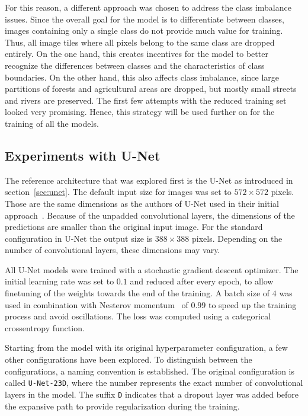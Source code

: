 For this reason, a different approach was chosen to address the class imbalance issues. Since the overall goal for the model is to differentiate between classes, images containing only a single class do not provide much value for training. Thus, all image tiles where all pixels belong to the same class are dropped entirely. On the one hand, this creates incentives for the model to better recognize the differences between classes and the characteristics of class boundaries. On the other hand, this also affects class imbalance, since large partitions of forests and agricultural areas are dropped, but mostly small streets and rivers are preserved. The first few attempts with the reduced training set looked    very promising. Hence, this strategy will be used further on for the training of all the models.


\subsection{Experiments with U-Net}
\label{sec:unet_experiments}
The reference architecture that was explored first is the U-Net as introduced in section~\ref{sec:unet}. The default input size for images was set to $572\times 572$ pixels. Those are the same dimensions as the authors of U-Net used in their initial approach~\cite{unet15}. Because of the unpadded convolutional layers, the dimensions of the predictions are smaller than the original input image. For the standard configuration in U-Net the output size is $388\times 388$ pixels. Depending on the number of convolutional layers, these dimensions may vary.

All U-Net models were trained with a stochastic gradient descent optimizer. The initial learning rate was set to $0.1$ and reduced after every epoch, to allow finetuning of the weights towards the end of the training. A batch size of $4$ was used in combination with Nesterov momentum~\cite{nesterov83} of $0.99$ to speed up the training process and avoid oscillations. The loss was computed using a categorical crossentropy function.

Starting from the model with its original hyperparameter configuration, a few other configurations have been explored. To distinguish between the configurations, a naming convention is established. The original configuration is called \texttt{U-Net-23D}, where the number represents the exact number of convolutional layers in the model. The suffix \texttt{D} indicates that a dropout layer was added before the expansive path to provide regularization during the training.

